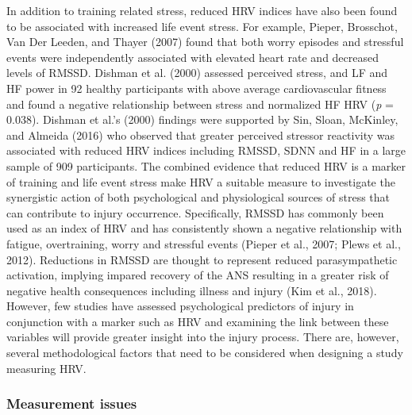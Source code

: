 \documentclass[man,floatsintext]{apa6}
\begin{document}
In addition to training related stress, reduced HRV indices have also been found to be associated with increased life event stress.
For example, Pieper, Brosschot, Van Der Leeden, and Thayer (2007)
found that both worry episodes and stressful events were independently associated with elevated heart rate and decreased levels of RMSSD.
Dishman et al. (2000)
assessed perceived stress, and LF and HF power in 92 healthy participants with above average cardiovascular fitness and found a negative relationship between stress and normalized HF HRV (\emph{p} = 0.038).
Dishman et al.'s (2000) findings were supported by Sin, Sloan, McKinley, and Almeida (2016)
who observed that greater perceived stressor reactivity was associated with reduced HRV indices including RMSSD, SDNN and HF in a large sample of 909 participants.
The combined evidence that reduced HRV is a marker of training and life event stress make HRV a suitable measure to investigate the synergistic action of both psychological and physiological sources of stress that can
contribute to injury occurrence.
Specifically, RMSSD has commonly been used as an index of HRV and has consistently shown a negative relationship with fatigue, overtraining, worry and stressful events (Pieper et al., 2007; Plews et al., 2012).
Reductions in RMSSD are thought to represent reduced parasympathetic activation, implying impared recovery of the ANS resulting in a greater risk of negative health consequences including illness and injury (Kim et al., 2018).
However, few studies have assessed psychological predictors of injury in conjunction with a marker such as HRV and examining the link between these variables will provide greater insight into the injury process.
There are, however, several methodological factors that need to be considered when designing a study measuring HRV.

\hypertarget{measurement-issues}{%
\subsubsection{Measurement issues}\label{measurement-issues}}
\end{document}
